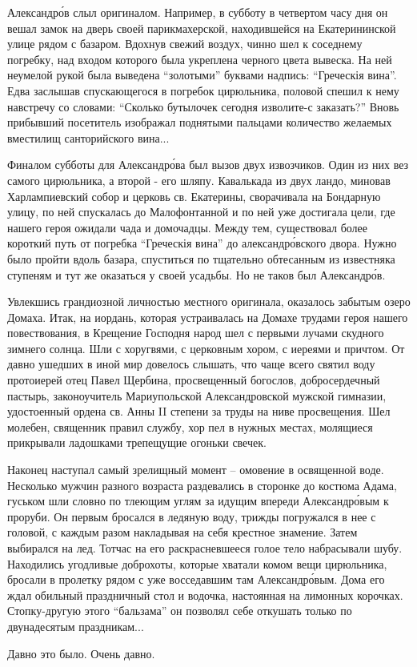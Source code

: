 Александр\'ов слыл оригиналом. Например, в субботу в четвертом часу дня он вешал
замок на дверь своей парикмахерской, находившейся на Екатерининской улице рядом
с базаром.  Вдохнув свежий воздух, чинно шел к соседнему  погребку, над входом
которого была укреплена черного цвета вывеска. На ней неумелой рукой была
выведена \enquote{золотыми} буквами надпись: \enquote{Греческія вина}. Едва заслышав
спускающегося в погребок цирюльника, половой спешил к нему навстречу со
словами: \enquote{Сколько бутылочек сегодня изволите-с заказать?} Вновь прибывший
посетитель изображал поднятыми пальцами количество желаемых вместилищ
санторийского вина...

Финалом субботы для Александр\'ова был вызов двух извозчиков. Один из них вез
самого цирюльника, а второй - его шляпу. Кавалькада из двух ландо, миновав
Харлампиевский собор и церковь св. Екатерины, сворачивала на Бондарную  улицу,
по ней спускалась до Малофонтанной и по ней уже достигала цели, где нашего
героя ожидали чада и домочадцы. Между тем, существовал более короткий  путь от
погребка  \enquote{Греческія вина} до александро́вского  двора. Нужно было пройти вдоль
базара, спуститься по тщательно обтесанным из известняка ступеням и тут же
оказаться у своей усадьбы. Но не таков  был  Александр\'ов.

Увлекшись грандиозной личностью местного оригинала, оказалось забытым озеро
Домаха.  Итак, на иордань, которая устраивалась на Домахе  трудами героя нашего
повествования, в Крещение Господня народ шел с первыми лучами скудного зимнего
солнца. Шли с хоругвями,  с церковным хором, с иереями и причтом. От давно
ушедших в иной мир довелось слышать, что чаще всего святил воду протоиерей отец
Павел Щербина, просвещенный богослов, добросердечный пастырь, законоучитель
Мариупольской Александровской мужской гимназии, удостоенный ордена  св. Анны II
степени за труды на ниве просвещения. Шел молебен, священник правил службу, хор
пел в нужных местах, молящиеся прикрывали ладошками трепещущие огоньки свечек.

Наконец наступал самый зрелищный момент – омовение в освященной воде. Несколько
мужчин разного возраста раздевались в сторонке до костюма Адама, гуськом шли
словно по тлеющим углям за идущим впереди Александр\'овым к проруби. Он первым
бросался в ледяную воду, трижды погружался в нее с головой, с каждым разом
накладывая на себя крестное знамение. Затем выбирался на лед. Тотчас на его
раскрасневшееся голое тело набрасывали шубу. Находились угодливые доброхоты,
которые хватали комом вещи цирюльника, бросали в пролетку рядом с уже
восседавшим там Александр\'овым. Дома его ждал обильный праздничный стол и
водочка, настоянная на лимонных корочках. Стопку-другую этого \enquote{бальзама} он
позволял себе откушать только по двунадесятым праздникам...

Давно это было. Очень давно.
